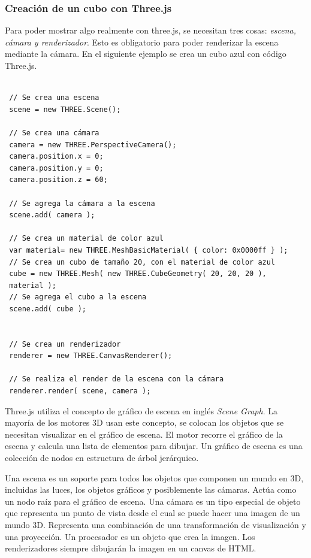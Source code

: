 \subsubsection{Creación de un cubo con Three.js}

Para poder mostrar algo realmente  con three.js, se necesitan tres cosas: \textit{escena, cámara y renderizador}. Esto es obligatorio para poder renderizar la escena mediante la cámara. En el siguiente ejemplo se crea un cubo azul con código Three.js. 

\begin{verbatim} 

 // Se crea una escena
 scene = new THREE.Scene();

 // Se crea una cámara
 camera = new THREE.PerspectiveCamera();
 camera.position.x = 0;
 camera.position.y = 0;
 camera.position.z = 60;
	
 // Se agrega la cámara a la escena		
 scene.add( camera );

 // Se crea un material de color azul			
 var material= new THREE.MeshBasicMaterial( { color: 0x0000ff } );
 // Se crea un cubo de tamaño 20, con el material de color azul 
 cube = new THREE.Mesh( new THREE.CubeGeometry( 20, 20, 20 ), 
 material );
 // Se agrega el cubo a la escena
 scene.add( cube );


 // Se crea un renderizador
 renderer = new THREE.CanvasRenderer();

 // Se realiza el render de la escena con la cámara
 renderer.render( scene, camera );

\end{verbatim}

Three.js utiliza el concepto de gráfico de escena en inglés \textit{Scene Graph}. La mayoría de los motores 3D usan este concepto, se colocan los objetos que se necesitan visualizar en el gráfico de escena. El motor recorre el gráfico de la escena y calcula una lista de elementos para dibujar. Un gráfico de escena es una colección de nodos en estructura de árbol jerárquico.

Una escena es un soporte para todos los objetos que componen un mundo en 3D, incluidas las luces, los objetos gráficos y posiblemente las cámaras. Actúa como un nodo raíz para el gráfico de escena. Una cámara es un tipo especial de objeto que representa un punto de vista desde el cual se puede hacer una imagen de un mundo 3D. Representa una combinación de una transformación de visualización y una proyección. Un procesador es un objeto que crea la imagen. Los renderizadores siempre dibujarán la imagen en un canvas de HTML.

